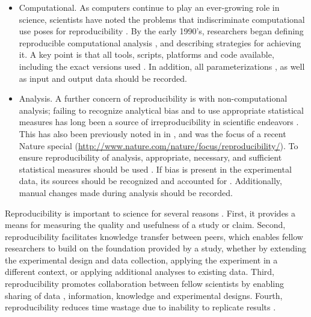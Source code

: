 \begin{itemize}
  \item Computational.  As computers continue to play an ever-growing role in 
  science, scientists have noted the problems that indiscriminate computational 
  use poses for reproducibility \cite{donoho2009, peng2011reproducible}.  
  By the early 1990's, researchers began defining reproducible 
  computational analysis \cite{donoho_wavelab}, and describing strategies for 
  achieving it.  A key point is that all tools, scripts, platforms and code 
  available, including the exact versions used
   \cite{ince2012open, nekrutenko2012next, blankenberg2014dissemination}.
  In addition, all parameterizations \cite{landis2012call}, as well
  as input and output data should be recorded.

  \item Analysis.  A further concern of reproducibility is with 
  non-computational analysis; failing to recognize analytical bias and to 
  use appropriate statistical measures has long been a source of 
  irreproducibility in scientific endeavors \cite{sackett1979bias}.
  This has also been previously noted in \cite{ioannidis2005most} 
  in \cite{nuzzo2014statistical, begley2013reproducibility}, 
  and was the focus of a recent Nature special 
  (\url{http://www.nature.com/nature/focus/reproducibility/}).
  To ensure reproducibility of analysis, appropriate, necessary, and sufficient
  statistical measures should be used
  \cite{pashler2012replicability, vaux2012numbers}.
  If bias is present in the experimental data, its sources should be recognized
  and accounted for \cite{macarthur2012reproducibility, wagenmakers2012agenda}.
  Additionally, manual changes made during analysis should be recorded.

\end{itemize}

Reproducibility is important to science for several reasons 
\cite{borgman2012conundrum}.  First, it 
provides a means for measuring the quality and usefulness of a study or 
claim.  Second, reproducibility facilitates knowledge transfer between 
peers, which enables fellow researchers to build on the foundation provided 
by a study, whether by extending the experimental design and data collection, 
applying the experiment in a different context, or applying additional analyses 
to existing data.  Third, reproducibility promotes collaboration between fellow 
scientists by enabling sharing of data \cite{rung2013reuse}, 
information, knowledge and experimental 
designs.  Fourth, reproducibility reduces time wastage due to inability to 
replicate results 
\cite{ioannidis2005most, mullard2011reliability, prinz2011reproducibility,
begley2012drug}. 


